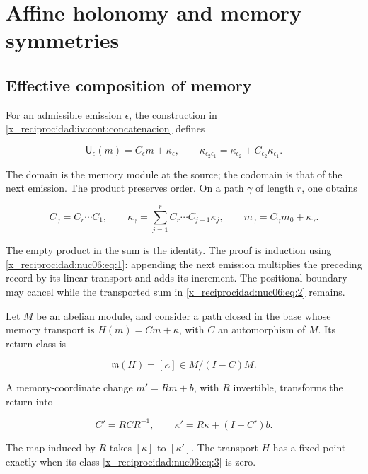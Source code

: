 \chapter{Affine holonomy and memory symmetries}
\label{x_reciprocidad:nuclear:6}
\section{Effective composition of memory}

For an admissible emission \(\epsilon\), the construction in \cref{x_reciprocidad:iv:cont:concatenacion} defines

\begin{equation}
\mathsf U_\epsilon(m)=C_\epsilon m+\kappa_\epsilon,
\qquad
\kappa_{\epsilon_2\epsilon_1}
=\kappa_{\epsilon_2}+C_{\epsilon_2}\kappa_{\epsilon_1}.
\label{x_reciprocidad:nuc06:eq:1}
\end{equation}

The domain is the memory module at the source; the codomain is that of the next emission. The product preserves order. On a path \(\gamma\) of length \(r\), one obtains

\begin{equation}
C_\gamma=C_r\cdots C_1,\qquad
\kappa_\gamma=\sum_{j=1}^r C_r\cdots C_{j+1}\kappa_j,
\qquad
m_\gamma=C_\gamma m_0+\kappa_\gamma.
\label{x_reciprocidad:nuc06:eq:2}
\end{equation}

The empty product in the sum is the identity. The proof is induction using \eqref{x_reciprocidad:nuc06:eq:1}: appending the next emission multiplies the preceding record by its linear transport and adds its increment. The positional boundary may cancel while the transported sum in \eqref{x_reciprocidad:nuc06:eq:2} remains.

\begin{proposition}

Let \(M\) be an abelian module, and consider a path closed in the base whose memory transport is \(H(m)=Cm+\kappa\), with \(C\) an automorphism of \(M\). Its return class is

\begin{equation}
\mathfrak m(H)=[\kappa]\in M/(I-C)M.
\label{x_reciprocidad:nuc06:eq:3}
\end{equation}

A memory-coordinate change \(m'=Rm+b\), with \(R\) invertible, transforms the return into

\begin{equation}
C'=RCR^{-1},\qquad
\kappa'=R\kappa+(I-C')b.
\label{x_reciprocidad:nuc06:eq:4}
\end{equation}

The map induced by \(R\) takes \([\kappa]\) to \([\kappa']\). The transport \(H\) has a fixed point exactly when its class \eqref{x_reciprocidad:nuc06:eq:3} is zero.
\end{proposition}

